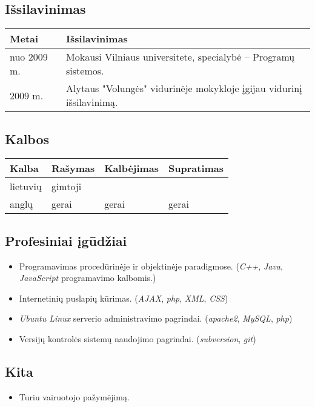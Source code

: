\subsection{Išsilavinimas}

\begin{tabular}[]{p{3cm} | p{8cm}}
  Metai & Išsilavinimas \\
  \hline
  nuo 2009 m. & Mokausi Vilniaus universitete, 
    specialybė – Programų sistemos. \\
  2009 m. & Alytaus "Volungės" vidurinėje mokykloje įgijau vidurinį išsilavinimą.
\end{tabular}

\subsection{Kalbos}

\begin{tabular}[]{p{3cm} | p{2.5cm} p{2.5cm} p{2.0cm}}
  Kalba & Rašymas & Kalbėjimas & Supratimas \\
  \hline
  lietuvių & gimtoji && \\
  anglų & gerai & gerai & gerai
\end{tabular}

\subsection{Profesiniai įgūdžiai}

\begin{itemize}
  \item Programavimas procedūrinėje ir objektinėje paradigmose. 
    (\emph{C++}, \emph{Java}, \emph{JavaScript} 
    programavimo kalbomis.)
  \item Internetinių puslapių kūrimas. (\emph{AJAX}, \emph{php}, 
    \emph{XML}, \emph{CSS})
  \item \emph{Ubuntu Linux} serverio administravimo pagrindai. 
    (\emph{apache2}, \emph{MySQL}, \emph{php})
  \item Versijų kontrolės sistemų naudojimo pagrindai. 
    (\emph{subversion}, \emph{git})
\end{itemize}

\subsection{Kita}

\begin{itemize}
  \item Turiu vairuotojo pažymėjimą.
\end{itemize}
